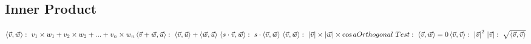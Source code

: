 \documentclass[12pt]{article}
\begin{document}
\subsection{Inner Product}
\begin{math}
\left \langle \vec{v},\vec{w} \right \rangle:\ v_{1}\times w_{1}+v_{2}\times w_{2}+...+v_{n}\times w_{n}\newline\newline
\left \langle \vec{v} + \vec{w}, \vec{u} \right \rangle:\ \left \langle \vec{v}, \vec{u} \right \rangle + \left \langle \vec{w}, \vec{u} \right \rangle\newline\newline
\left \langle s\cdot \vec{v},\vec{w} \right \rangle:\ s\cdot \left \langle \vec{v},\vec{w} \right \rangle\newline\newline
\left \langle \vec{v},\vec{w} \right \rangle:\ \left | \vec{v} \right |\times\left | \vec{w} \right |\times\cos a \newline\newline
Orthogonal\ Test:\ \left \langle \vec{v},\vec{w} \right \rangle=0\newline\newline
\left \langle \vec{v},\vec{v} \right \rangle:\ \left | \vec{v} \right |^{2}\newline\newline
\left | \vec{v} \right |:\ \sqrt{\left \langle \vec{v},\vec{v} \right \rangle}\newline\newline
\end{math}
\end{document}

